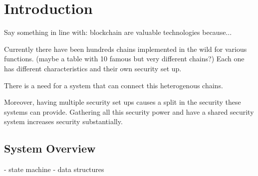 \section{Introduction}
Say something in line with: blockchain are valuable technologies because...

Currently there have been hundreds chains implemented in the wild for various functions.
(maybe a table with 10 famous but very different chains?)
Each one has different characteristics and their own security set up.

There is a need for a system that can connect this heterogenous chains.

Moreover, having multiple security set ups causes a split in the security these systems can provide.
Gathering all this security power and have a shared security system increases security substantially.


\subsection{System Overview}
- state machine
- data structures
